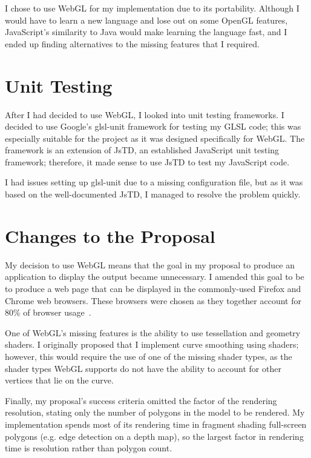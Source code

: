 \documentclass[12pt,twoside,notitlepage]{report}
\begin{document}
I chose to use WebGL for my implementation due to its portability. Although I would have to learn a new language and lose out on some OpenGL features, JavaScript's similarity to Java would make learning the language fast, and I ended up finding alternatives to the missing features that I required.

\section{Unit Testing}

After I had decided to use WebGL, I looked into unit testing frameworks. I decided to use Google's glsl-unit framework for testing my GLSL code; this was especially suitable for the project as it was designed specifically for WebGL. The framework is an extension of JsTD, an established JavaScript unit testing framework; therefore, it made sense to use JsTD to test my JavaScript code.

I had issues setting up glsl-unit due to a missing configuration file, but as it was based on the well-documented JsTD, I managed to resolve the problem quickly.

\section{Changes to the Proposal}

My decision to use WebGL means that the goal in my proposal to produce an application to display the output became unnecessary. I amended this goal to be to produce a web page that can be displayed in the commonly-used Firefox and Chrome web browsers. These browsers were chosen as they together account for 80\% of browser usage~\cite{W3Schools:BrowserShare}.

One of WebGL's missing features is the ability to use tessellation and geometry shaders. I originally proposed that I implement curve smoothing using shaders; however, this would require the use of one of the missing shader types, as the shader types WebGL supports do not have the ability to account for other vertices that lie on the curve.

Finally, my proposal's success criteria omitted the factor of the rendering resolution, stating only the number of polygons in the model to be rendered. My implementation spends most of its rendering time in fragment shading full-screen polygons (e.g. edge detection on a depth map), so the largest factor in rendering time is resolution rather than polygon count.
\end{document}
